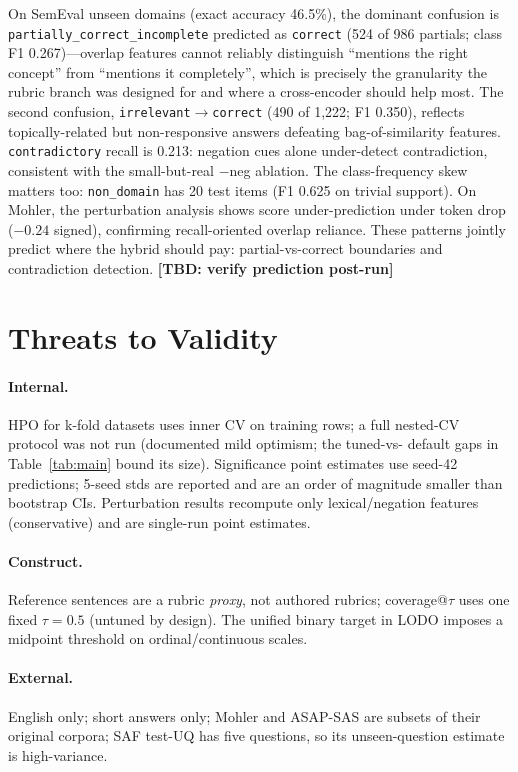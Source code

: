 \documentclass[11pt]{article}
\newcommand{\TBD}[1]{\textbf{[TBD: #1]}}
\begin{document}
On SemEval unseen domains (exact accuracy 46.5\%), the dominant confusion is
\texttt{partially\_correct\_incomplete} predicted as \texttt{correct} (524 of
986 partials; class F1 0.267)---overlap features cannot reliably distinguish
``mentions the right concept'' from ``mentions it completely'', which is
precisely the granularity the rubric branch was designed for and where a
cross-encoder should help most. The second confusion,
\texttt{irrelevant}$\rightarrow$\texttt{correct} (490 of 1{,}222; F1 0.350),
reflects topically-related but non-responsive answers defeating
bag-of-similarity features. \texttt{contradictory} recall is 0.213: negation
cues alone under-detect contradiction, consistent with the small-but-real
$-$neg ablation. The class-frequency skew matters too: \texttt{non\_domain}
has 20 test items (F1 0.625 on trivial support). On Mohler, the perturbation
analysis shows score under-prediction under token drop ($-0.24$ signed),
confirming recall-oriented overlap reliance. These patterns jointly predict
where the hybrid should pay: partial-vs-correct boundaries and
contradiction detection. \TBD{verify prediction post-run}

\section{Threats to Validity}
\label{sec:threats}

\paragraph{Internal.} HPO for k-fold datasets uses inner CV on training rows;
a full nested-CV protocol was not run (documented mild optimism; the tuned-vs-
default gaps in Table~\ref{tab:main} bound its size). Significance point
estimates use seed-42 predictions; 5-seed stds are reported and are an order
of magnitude smaller than bootstrap CIs. Perturbation results recompute only
lexical/negation features (conservative) and are single-run point estimates.
\paragraph{Construct.} Reference sentences are a rubric \emph{proxy}, not
authored rubrics; coverage@$\tau$ uses one fixed $\tau{=}0.5$ (untuned by
design). The unified binary target in LODO imposes a midpoint threshold on
ordinal/continuous scales. \paragraph{External.} English only; short answers
only; Mohler and ASAP-SAS are subsets of their original corpora; SAF test-UQ
has five questions, so its unseen-question estimate is high-variance.
\end{document}
